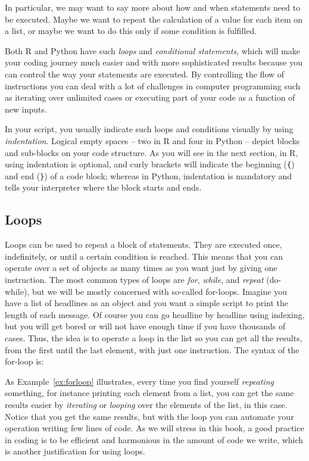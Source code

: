 In particular, we may want to say more about how and when
statements need to be executed. Maybe we want to repeat
the calculation of a value for each item on a list, or maybe
we want to do this only if some condition is fulfilled.

Both R and Python have such \emph{loops} and \emph{conditional statements}, which will
make your coding journey much easier and with more sophisticated
results because you can control the way your statements are
executed. By controlling the flow of instructions you can deal with a
lot of challenges in computer programming such as iterating over
unlimited cases or executing part of your code as a function of new
inputs.

In your script, you usually indicate such loops and conditions
visually by using \emph{indentation}. Logical empty spaces -- two in R and four in
Python -- depict blocks and sub-blocks on your code structure.
As you will see in the next section, in R, using indentation
is optional, and curly brackets will indicate the beginning (\verb|{|)
and end (\verb|}|) of a code block; whereas in Python, indentation
is mandatory and tells your interpreter where the block
starts and ends.





\subsection{Loops} \label{sec:loops}

Loops can be used to repeat a block of statements.
They are executed once, indefinitely, or
until a certain condition is reached. This means that you can operate
over a set of objects as many times as you want just by giving one
instruction. The most common types of loops are \emph{for},
\emph{while}, and \emph{repeat} (do-while), but we will be mostly
concerned with so-called for-loops. Imagine you have a list of
headlines as an object and you want a simple script
to print the length of each message. Of course you can go headline
by headline using indexing, but you will get bored or will not
have  enough time if you have thousands of cases. Thus, the idea is to
operate a loop in the list so you can get all the results, from the
first until the last element, with just one instruction. The syntax
of the for-loop is:



As Example~\ref{ex:forloop} illustrates, every time you find yourself
\emph{repeating} something, for instance printing each element from a
list, you can get the same results easier by \emph{iterating} or
\emph{looping} over the elements of the list, in this case.  Notice
that you get the same results, but with the loop you can automate your
operation writing few lines of code. As we will stress in this
book, a good practice in coding is to be efficient and harmonious in
the amount of code we write, which is another justification for using
loops.

